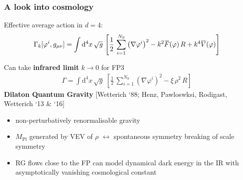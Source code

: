 \documentclass[]{beamer}  %
\newcommand\NS{ N_{\scriptscriptstyle{\mathrm{S}}} }
\newcommand\MPl{ M_{\scriptscriptstyle{\mathrm{Pl}}}{} }
\newcommand{\overbar}[1]{\mkern 1.5mu\overline{\mkern-1.5mu#1\mkern-1.5mu}\mkern 1.5mu}
\begin{document}
\begin{frame}
  \frametitle{A look into cosmology}

  Effective average action in $d=4$:
  \begin{align*}
      \Gamma_k [\varphi^i, g_{\mu\nu}] =
      \int \mathrm d^4x \, \sqrt{g} \,
      \left[
          \frac{1}{2} \, \sum_{i=1}^{\NS} \left( \nabla\varphi^i \right)^2
        - k^2 \overbar F(\varphi) \, R
        + k^4 \overbar V(\varphi)
      \right]
  \end{align*}

  Can take \textbf{infrared limit} $k \rightarrow 0$ for FP3
  \begin{align*}
    \boxed{
      \Gamma = \int \mathrm{d}^4x \, \sqrt{g} \;
      \left[
        \frac{1}{2} \, \sum_{i=1}^{\NS} \left( \nabla\varphi^i \right)^2
        - \xi \, \rho^2 \, R
      \right]
    }
  \end{align*}
  \hfill \textbf{Dilaton Quantum Gravity} [Wetterich `88; Henz, Pawloswksi, Rodigast, Wetterich `13 \& `16]

  \vspace{10pt}
  \begin{itemize}
    \item non-perturbatively renormalisable gravity\\[5pt]
    \item $\MPl$ generated by VEV of $\rho$ $\leftrightarrow$ spontaneous symmetry breaking of scale symmetry\\[5pt]
    \item RG flows close to the FP can model dynamical dark energy in the IR
      with asymptotically vanishing cosmological constant %
  \end{itemize}

\end{frame}


\end{document}

